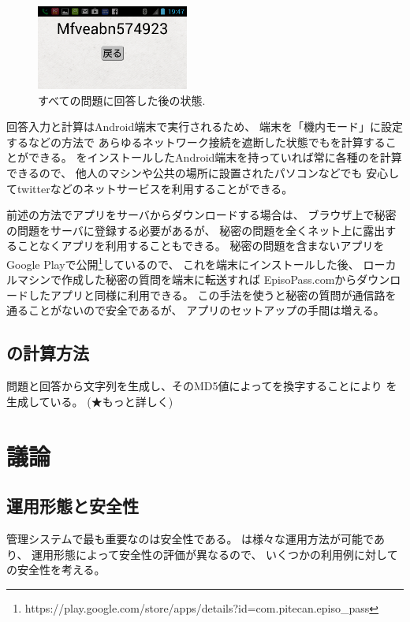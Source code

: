 \documentclass[twoside]{wiss}
\begin{document}
\begin{figure}[H]
\centerline{\includegraphics[width=50mm,bb=0 0 720 400]{figures/android3crop.png}}
\caption{すべての問題に回答した後の状態.}
\label{android3}
\end{figure}

回答入力と{\PW}計算はAndroid端末で実行されるため、
端末を「機内モード」に設定するなどの方法で
あらゆるネットワーク接続を遮断した状態でも{\PW}を計算することができる。
{\EP}をインストールしたAndroid端末を持っていれば常に各種の{\PW}を計算できるので、
他人のマシンや公共の場所に設置されたパソコンなどでも
安心してtwitterなどのネットサービスを利用することができる。

前述の方法で{\EP}アプリをサーバからダウンロードする場合は、
ブラウザ上で秘密の問題をサーバに登録する必要があるが、
秘密の問題を全くネット上に露出することなくアプリを利用することもできる。
秘密の問題を含まない{\EP}アプリをGoogle Playで公開\footnote{
 {\textsf{https://play.google.com/{\allowbreak}store/{\allowbreak}apps/{\allowbreak}details?{\allowbreak}id=com.{\allowbreak}pitecan.{\allowbreak}episo\_pass}}
}しているので、
これを端末にインストールした後、
ローカルマシンで作成した秘密の質問を端末に転送すれば
EpisoPass.comからダウンロードしたアプリと同様に利用できる。
この手法を使うと秘密の質問が通信路を通ることがないので安全であるが、
アプリのセットアップの手間は増える。

\subsection{{\PW}の計算方法}

問題と回答から文字列を生成し、そのMD5値によって{\SS}を換字することにより
{\PW}を生成している。
(★もっと詳しく)

\section{議論}

\subsection{運用形態と安全性}

{\PW}管理システムで最も重要なのは安全性である。
%
{\EP}は様々な運用方法が可能であり、
運用形態によって安全性の評価が異なるので、
いくつかの利用例に対して{\EP}の安全性を考える。
\end{document}
